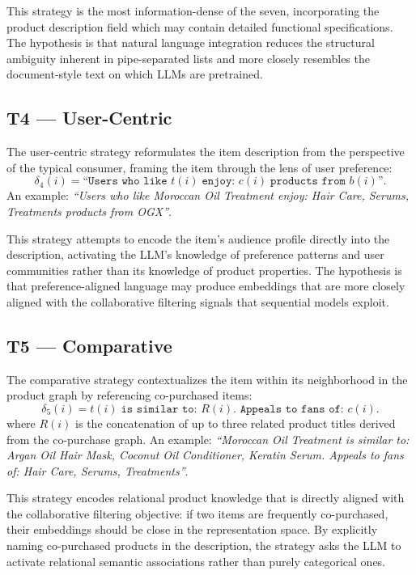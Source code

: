 \documentclass[12pt,a4paper]{report}
\begin{document}
This strategy is the most information-dense of the seven,
incorporating the product description field which may contain
detailed functional specifications. The hypothesis is that
natural language integration reduces the structural ambiguity
inherent in pipe-separated lists and more closely resembles
the document-style text on which LLMs are pretrained.

\subsection{T4 --- User-Centric}

The user-centric strategy reformulates the item description
from the perspective of the typical consumer, framing the
item through the lens of user preference:
\begin{equation}
  \delta_4(i) = \texttt{``Users who like } t(i)
    \;\texttt{enjoy: } c(i)
    \;\texttt{products from } b(i)\texttt{''}.
\end{equation}
An example: \textit{``Users who like Moroccan Oil Treatment
enjoy: Hair Care, Serums, Treatments products from OGX''}.

This strategy attempts to encode the item's audience profile
directly into the description, activating the LLM's knowledge
of preference patterns and user communities rather than its
knowledge of product properties. The hypothesis is that
preference-aligned language may produce embeddings that are
more closely aligned with the collaborative filtering signals
that sequential models exploit.

\subsection{T5 --- Comparative}

The comparative strategy contextualizes the item within its
neighborhood in the product graph by referencing co-purchased
items:
\begin{equation}
  \delta_5(i) = t(i)
    \;\texttt{is similar to: } R(i)
    \texttt{. Appeals to fans of: } c(i).
\end{equation}
where $R(i)$ is the concatenation of up to three related
product titles derived from the co-purchase graph.
An example: \textit{``Moroccan Oil Treatment is similar to:
Argan Oil Hair Mask, Coconut Oil Conditioner, Keratin Serum.
Appeals to fans of: Hair Care, Serums, Treatments''}.

This strategy encodes relational product knowledge that is
directly aligned with the collaborative filtering objective:
if two items are frequently co-purchased, their embeddings
should be close in the representation space. By explicitly
naming co-purchased products in the description, the strategy
asks the LLM to activate relational semantic associations
rather than purely categorical ones.
\end{document}
